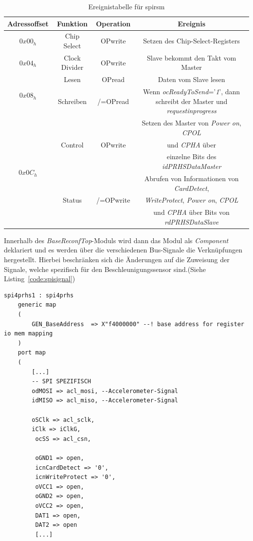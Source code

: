 \begin{table}[h!]
\centering
\scriptsize
\begin{tabular}{c|c|c|c}
\toprule
\multicolumn{1}{c|}{\textbf{Adressoffset}} & \multicolumn{1}{c|}{\textbf{Funktion}}  & \multicolumn{1}{c|}{\textbf{Operation}} & \multicolumn{1}{c}{\textbf{Ereignis}} \\
\midrule
\centering
$0x00_{h}$ & Chip Select & OPwrite & Setzen des Chip-Select-Registers\\
\hline
$0x04_{h}$ & Clock Divider & OPwrite & Slave bekommt den Takt vom Master\\
\hline
  \multirow{2}{*}{$0x08_{h}$}
            &  Lesen & OPread & Daten vom Slave lesen\\
    \cline{2-4}
            & Schreiben & /=OPread & Wenn \emph{ocReadyToSend}='\emph{1}', dann schreibt der Master und \emph{requestinprogress}\\
\hline
\multirow{6}{*}{$0x0C_{h}$}
          &  &  & Setzen des Master von \emph{Power on}, \emph{CPOL} \\
          &  Control   & OPwrite  &  und \emph{CPHA} über \\
          &    &   &  einzelne Bits des \emph{idPRHSDataMaster}\\
  \cline{2-4}
          &   &   & Abrufen von Informationen von \emph{CardDetect},\\
            & Status & /=OPwrite & \emph{WriteProtect}, \emph{Power on}, \emph{CPOL}  \\
            &   &   &  und \emph{CPHA} über Bits von \emph{rdPRHSDataSlave}  \\
\bottomrule
\end{tabular}
\caption{Ereignistabelle für \ac{spi}rsm}
\label{tab:ereignissespi}
\end{table}

\newpage
Innerhalb des \emph{BaseReconfTop}-Moduls\cite{MEckertDiss} wird dann das Modul als \emph{Component} deklariert und es
werden über die verschiedenen Bus-Signale die Verknüpfungen hergestellt. Hierbei beschränken sich die Änderungen
auf die Zuweisung der Signale, welche spezifisch für den Beschleunigungssensor sind.(Siehe Listing~\ref{code:spisignal})\\

\begin{lstlisting}[caption={Zuweisung der Signale des Beschleunigungssensors},label={code:spisignal}]
  spi4prhs1 : spi4prhs
    generic map
    (
        GEN_BaseAddress  => X"f4000000" --! base address for register io mem mapping
    )
    port map
    (
        [...]
        -- SPI SPEZIFISCH
        odMOSI => acl_mosi, --Accelerometer-Signal
        idMISO => acl_miso, --Accelerometer-Signal

        oSClk => acl_sclk,
        iClk => iClkG,
         ocSS => acl_csn,

         oGND1 => open,
         icnCardDetect => '0',
         icnWriteProtect => '0',
         oVCC1 => open,
         oGND2 => open,
         oVCC2 => open,
         DAT1 => open,
         DAT2 => open
         [...]
 \end{lstlisting}

